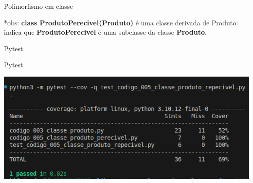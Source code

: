 \begin{frame}[t]{Polimorfismo em classe}	
	
	
	
	\vspace{1em}
	
	*obs: \textbf{class ProdutoPerecivel(Produto)} é uma classe derivada de Produto: indica que \textbf{ProdutoPerecivel} é uma subclasse da classe \textbf{Produto}.
	
\end{frame}

\begin{frame}[t]{Pytest}
	
	
	
	
\end{frame}




\begin{frame}[t]{Pytest}
	
	\centering
	\includegraphics[scale=0.5]{imagens/fig-result-test-especifico-produto-perecivel.png}
	
\end{frame}


